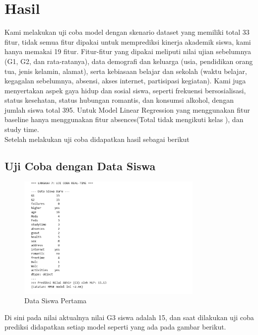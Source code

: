 \chapter*{Hasil}

Kami melakukan uji coba model dengan skenario dataset yang memiliki total 33 fitur, tidak semua fitur dipakai untuk memprediksi kinerja akademik siswa, kami hanya
memakai 19 fitur. Fitur-fitur yang dipakai 
meliputi nilai ujian sebelumnya {(G1, G2, dan rata-ratanya)}, data demografi dan keluarga {(usia, pendidikan orang tua, jenis kelamin, alamat)}, 
serta kebiasaan belajar dan sekolah (waktu belajar, kegagalan sebelumnya, absensi, akses internet, partisipasi kegiatan). Kami juga menyertakan 
aspek gaya hidup dan sosial siswa, seperti frekuensi bersosialisasi, status kesehatan, status hubungan romantis, dan konsumsi alkohol, dengan jumlah
siswa total 395. Untuk Model Linear Regression yang menggunakan fitur baseline hanya menggunakan fitur absences(Total tidak mengikuti kelas ), 
dan study time.\\

Setelah melakukan uji coba didapatkan hasil sebagai berikut

\section{Uji Coba dengan Data Siswa}

\begin{figure}[h]
    \centering
    \includegraphics[width=0.8\textwidth]{images/datasiswa2.png}
    \caption{Data Siswa Pertama}
    \label{fig:datasiswa1}
\end{figure}

Di sini pada nilai aktualnya nilai G3 siswa adalah 15, dan saat dilakukan uji coba prediksi didapatkan setiap model seperti yang ada 
pada gambar berikut.

